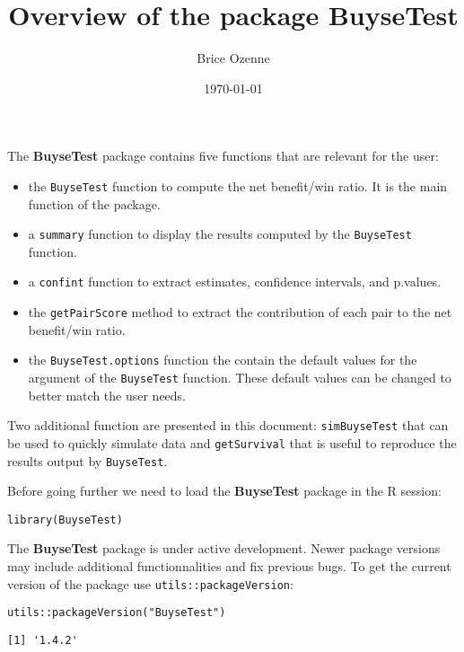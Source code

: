 \documentclass[12pt]{article}
\author{Brice Ozenne}
\date{\today}
\title{Overview of the package BuyseTest}
\begin{document}
\maketitle
The \textbf{BuyseTest} package contains five functions that are relevant for the user:
\begin{itemize}
\item the \texttt{BuyseTest} function to compute the net benefit/win ratio. It is
the main function of the package.
\item a \texttt{summary} function to display the results computed by the \texttt{BuyseTest} function.
\item a \texttt{confint} function to extract estimates, confidence intervals, and p.values.
\item the \texttt{getPairScore} method to extract the contribution of each pair to the net benefit/win ratio.
\item the \texttt{BuyseTest.options} function the contain the default values for
the argument of the \texttt{BuyseTest} function. These default values can
be changed to better match the user needs.
\end{itemize}

Two additional function are presented in this document: \texttt{simBuyseTest}
that can be used to quickly simulate data and \texttt{getSurvival} that is
useful to reproduce the results output by \texttt{BuyseTest}.

\vfill

Before going further we need to load the \textbf{BuyseTest} package in the R
session:
\lstset{language=r,label= ,caption= ,captionpos=b,numbers=none}
\begin{lstlisting}
library(BuyseTest)
\end{lstlisting}

\bigskip

The \textbf{BuyseTest} package is under active development. Newer package
versions may include additional functionnalities and fix previous
bugs. To get the current version of the package use
\texttt{utils::packageVersion}:
\lstset{language=r,label= ,caption= ,captionpos=b,numbers=none}
\begin{lstlisting}
utils::packageVersion("BuyseTest")
\end{lstlisting}

\begin{verbatim}
[1] '1.4.2'
\end{verbatim}

\vfill
\end{document}
